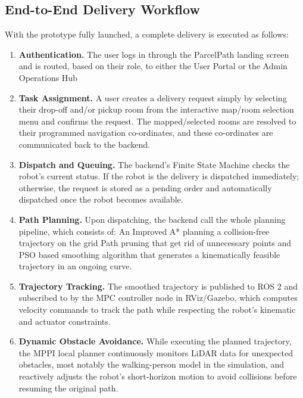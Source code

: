 \subsection*{End-to-End Delivery Workflow}

With the prototype fully launched, a complete delivery is executed as follows:

\begin{enumerate}
	\item \textbf{Authentication.} The user logs in through the ParcelPath
	landing screen and is routed, based on their role, to either the User
	Portal or the Admin Operations Hub
	
	\item \textbf{Task Assignment.} A user creates a delivery request simply by selecting their drop-off and/or pickup room from the interactive map/room selection menu and confirms the request. The mapped/selected rooms are resolved to their programmed navigation co-ordinates, and these co-ordinates are communicated back to the backend.
	
	\item \textbf{Dispatch and Queuing.} The backend's Finite State Machine
 checks the robot's current status. If the
	robot is the delivery is dispatched immediately; otherwise,
	the request is stored as a pending order and automatically dispatched once
	the robot becomes available.
	
	\item \textbf{Path Planning.} Upon dispatching, the backend call the whole
	planning pipeline, which consists of: An Improved A* planning a collision-free trajectory on the
	grid Path pruning that get rid of unnecessary points and PSO based smoothing algorithm that generates a
	kinematically feasible trajectory in an ongoing curve.
	\item \textbf{Trajectory Tracking.} The smoothed trajectory is published
	to ROS 2 and subscribed to by the MPC controller node in RViz/Gazebo, which computes velocity commands to
	track the path while respecting the robot's kinematic and actuator
	constraints.
	
	\item \textbf{Dynamic Obstacle Avoidance.} While executing the planned
	trajectory, the MPPI local planner continuously monitors LiDAR data for unexpected obstacles, most notably the
	walking-person model in the simulation, and reactively adjusts the robot's
	short-horizon motion to avoid collisions before resuming the original path.
	

\end{enumerate}
